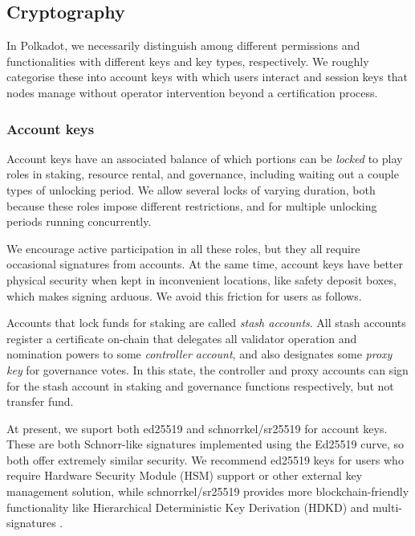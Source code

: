 \subsection{Cryptography}\label{sec:crypto}

In Polkadot, we necessarily distinguish among different permissions and functionalities with different keys and key types, respectively.  We roughly categorise these into account keys with which users interact and session keys that nodes manage without operator intervention beyond a certification process.

\subsubsection{Account keys}

Account keys have an associated balance of which portions can be {\em locked} to play roles in staking, resource rental, and governance, including waiting out a couple types of unlocking period.  We allow several locks of varying duration, both because these roles impose different restrictions, and for multiple unlocking periods running concurrently. 

We encourage active participation in all these roles, but they all require occasional signatures from accounts.  At the same time, account keys have better physical security when kept in inconvenient locations, like safety deposit boxes, which makes signing arduous.  We avoid this friction for users as follows.

Accounts that lock funds for staking are called {\em stash accounts}.  All stash accounts register a certificate on-chain that delegates all validator operation and nomination powers to some {\em controller account}, and also designates some {\em proxy key} for governance votes.  In this state, the controller and proxy accounts can sign for the stash account in staking and governance functions respectively, but not transfer fund.  

\smallskip

At present, we suport both ed25519 \cite{} and schnorrkel/sr25519 \cite{} for account keys.  These are both Schnorr-like signatures implemented using the Ed25519 curve, so both offer extremely similar security.  We recommend ed25519 keys for users who require Hardware Security Module (HSM) support or other external key management solution, while schnorrkel/sr25519 provides more blockchain-friendly functionality like Hierarchical Deterministic Key Derivation (HDKD) and multi-signatures \cite{}.  

